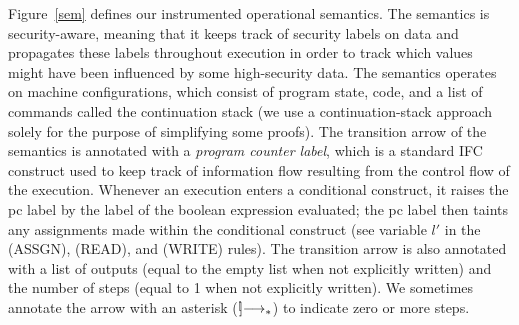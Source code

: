 Figure~\ref{sem} defines our instrumented operational semantics. The semantics is 
security-aware, meaning that it keeps track of security
labels on data and propagates these labels throughout execution in order to track which 
values might have been influenced by
some high-security data. The semantics operates on machine configurations, which consist 
of program state, code, and a list of 
commands called the continuation stack (we use a continuation-stack approach solely for 
the purpose of simplifying some 
proofs). The transition arrow of the semantics is annotated with a \emph{program counter label}, 
which is a standard IFC 
construct used to keep track of information flow resulting from the control flow of the 
execution. Whenever an execution 
enters a conditional construct, it raises the pc label by the label of the boolean 
expression evaluated; the pc label then taints any assignments made 
within the conditional construct (see variable $l'$ in the (ASSGN), (READ), and (WRITE) 
rules). The transition arrow is also annotated with a
list of outputs (equal to the empty list when not explicitly written) and the number of 
steps (equal to 1 when not explicitly written).
We sometimes annotate the arrow with an asterisk ($\stackrel[\!\!]{}{\longrightarrow_{*}}$) to indicate zero
or more steps.

